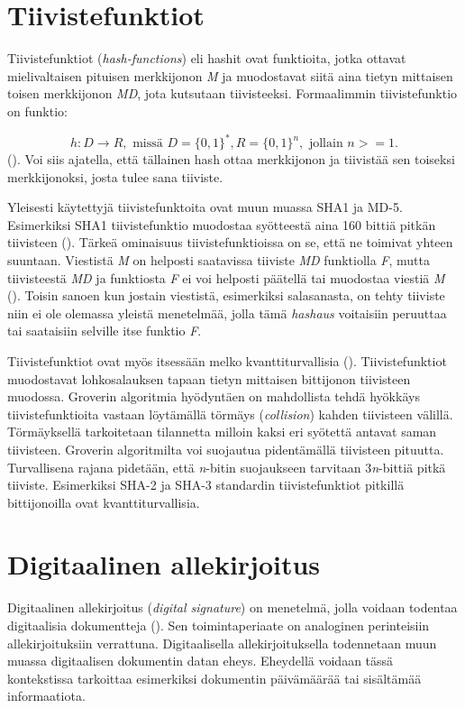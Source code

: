  \section{Tiivistefunktiot}
 Tiivistefunktiot (\emph{hash-functions}) eli hashit  ovat funktioita, jotka ottavat mielivaltaisen pituisen merkkijonon \emph{M} ja muodostavat siitä aina tietyn mittaisen toisen merkkijonon \emph{MD}, jota kutsutaan tiivisteeksi. Formaalimmin tiivistefunktio on funktio:
 
 \[h: D \to R, \text{ missä } D = \big\{0,1\big\}^{*}, R = \big\{0,1\big\}^{n}, \text{ jollain } n >= 1.\] (\cite{sobti2012cryptographic}). Voi siis ajatella, että tällainen hash ottaa merkkijonon ja tiivistää sen toiseksi merkkijonoksi, josta tulee sana tiiviste.
 
 Yleisesti käytettyjä tiivistefunktoita ovat muun muassa SHA1 ja MD-5. Esimerkiksi SHA1 tiivistefunktio muodostaa syötteestä aina 160 bittiä pitkän tiivisteen (\cite{bellare2005introduction}). Tärkeä ominaisuus tiivistefunktioissa on se, että ne toimivat yhteen suuntaan. Viestistä \emph{M} on helposti saatavissa tiiviste \emph{MD} funktiolla \emph{F}, mutta tiivisteestä \emph{MD} ja funktiosta \emph{F} ei voi helposti päätellä tai muodostaa viestiä \emph{M} (\cite{bakhtiari1995cryptographic}). Toisin sanoen kun jostain viestistä, esimerkiksi salasanasta, on tehty tiiviste niin ei ole olemassa yleistä menetelmää, jolla tämä \emph{hashaus} voitaisiin peruuttaa tai saataisiin selville itse funktio \emph{F}.
 
 Tiivistefunktiot ovat myös itsessään melko kvanttiturvallisia (\cite{mavroeidis2018impact}). Tiivistefunktiot muodostavat lohkosalauksen tapaan tietyn mittaisen bittijonon tiivisteen muodossa. Groverin algoritmia hyödyntäen on mahdollista tehdä hyökkäys tiivistefunktioita vastaan löytämällä törmäys (\emph{collision}) kahden tiivisteen välillä. Törmäyksellä tarkoitetaan tilannetta milloin kaksi eri syötettä antavat saman tiivisteen. Groverin algoritmilta voi suojautua pidentämällä tiivisteen pituutta. Turvallisena rajana pidetään, että \emph{n}-bitin suojaukseen tarvitaan 3\emph{n}-bittiä pitkä tiiviste. Esimerkiksi SHA-2 ja SHA-3 standardin tiivistefunktiot pitkillä bittijonoilla ovat kvanttiturvallisia.
 
 \section{Digitaalinen allekirjoitus}
 Digitaalinen allekirjoitus (\emph{digital signature}) on menetelmä, jolla voidaan todentaa digitaalisia dokumentteja (\cite{1649003}). Sen toimintaperiaate on analoginen perinteisiin allekirjoituksiin verrattuna. Digitaalisella allekirjoituksella todennetaan muun muassa digitaalisen dokumentin datan eheys. Eheydellä voidaan tässä kontekstissa tarkoittaa esimerkiksi dokumentin päivämäärää tai sisältämää informaatiota.
 
